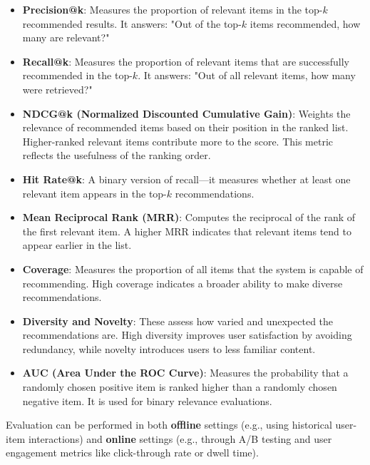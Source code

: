 \begin{itemize}
	\item \textbf{Precision@k}: Measures the proportion of relevant items in the top-\(k\) recommended results. It answers: "Out of the top-\(k\) items recommended, how many are relevant?"

	\item \textbf{Recall@k}: Measures the proportion of relevant items that are successfully recommended in the top-\(k\). It answers: "Out of all relevant items, how many were retrieved?"

	\item \textbf{NDCG@k (Normalized Discounted Cumulative Gain)}: Weights the relevance of recommended items based on their position in the ranked list. Higher-ranked relevant items contribute more to the score. This metric reflects the usefulness of the ranking order.

	\item \textbf{Hit Rate@k}: A binary version of recall—it measures whether at least one relevant item appears in the top-\(k\) recommendations.

	\item \textbf{Mean Reciprocal Rank (MRR)}: Computes the reciprocal of the rank of the first relevant item. A higher MRR indicates that relevant items tend to appear earlier in the list.

	\item \textbf{Coverage}: Measures the proportion of all items that the system is capable of recommending. High coverage indicates a broader ability to make diverse recommendations.

	\item \textbf{Diversity and Novelty}: These assess how varied and unexpected the recommendations are. High diversity improves user satisfaction by avoiding redundancy, while novelty introduces users to less familiar content.

	\item \textbf{AUC (Area Under the ROC Curve)}: Measures the probability that a randomly chosen positive item is ranked higher than a randomly chosen negative item. It is used for binary relevance evaluations.

\end{itemize}

Evaluation can be performed in both \textbf{offline} settings (e.g., using historical user-item interactions) and \textbf{online} settings (e.g., through A/B testing and user engagement metrics like click-through rate or dwell time).
